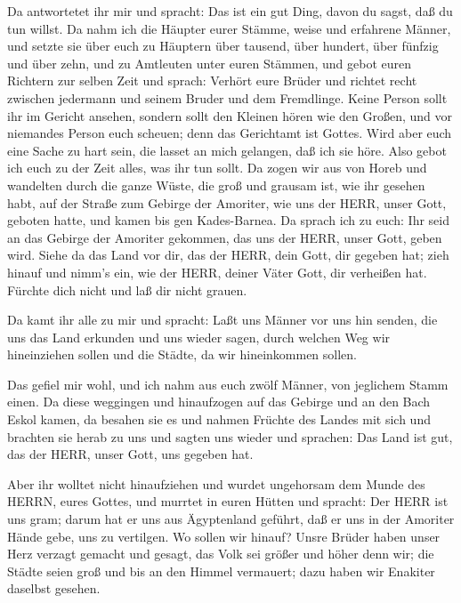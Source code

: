  Da antwortetet ihr mir und spracht: Das ist ein gut Ding,
davon du sagst, daß du tun willst.  Da nahm ich die Häupter
eurer Stämme, weise und erfahrene Männer, und setzte sie über euch zu
Häuptern über tausend, über hundert, über fünfzig und über zehn, und zu
Amtleuten unter euren Stämmen,  und gebot euren Richtern
zur selben Zeit und sprach: Verhört eure Brüder und richtet recht
zwischen jedermann und seinem Bruder und dem Fremdlinge. 
Keine Person sollt ihr im Gericht ansehen, sondern sollt den Kleinen
hören wie den Großen, und vor niemandes Person euch scheuen; denn das
Gerichtamt ist Gottes. Wird aber euch eine Sache zu hart sein, die
lasset an mich gelangen, daß ich sie höre.  Also gebot ich
euch zu der Zeit alles, was ihr tun sollt.  Da zogen wir
aus von Horeb und wandelten durch die ganze Wüste, die groß und grausam
ist, wie ihr gesehen habt, auf der Straße zum Gebirge der Amoriter, wie
uns der HERR, unser Gott, geboten hatte, und kamen bis gen Kades-Barnea.
 Da sprach ich zu euch: Ihr seid an das Gebirge der
Amoriter gekommen, das uns der HERR, unser Gott, geben wird.
 Siehe da das Land vor dir, das der HERR, dein Gott, dir
gegeben hat; zieh hinauf und nimm's ein, wie der HERR, deiner Väter
Gott, dir verheißen hat. Fürchte dich nicht und laß dir nicht grauen.

 Da kamt ihr alle zu mir und spracht: Laßt uns Männer vor
uns hin senden, die uns das Land erkunden und uns wieder sagen, durch
welchen Weg wir hineinziehen sollen und die Städte, da wir hineinkommen
sollen.

 Das gefiel mir wohl, und ich nahm aus euch zwölf Männer,
von jeglichem Stamm einen.  Da diese weggingen und
hinaufzogen auf das Gebirge und an den Bach Eskol kamen, da besahen sie
es  und nahmen Früchte des Landes mit sich und brachten sie
herab zu uns und sagten uns wieder und sprachen: Das Land ist gut, das
der HERR, unser Gott, uns gegeben hat.

 Aber ihr wolltet nicht hinaufziehen und wurdet ungehorsam
dem Munde des HERRN, eures Gottes,  und murrtet in euren
Hütten und spracht: Der HERR ist uns gram; darum hat er uns aus
Ägyptenland geführt, daß er uns in der Amoriter Hände gebe, uns zu
vertilgen.  Wo sollen wir hinauf? Unsre Brüder haben unser
Herz verzagt gemacht und gesagt, das Volk sei größer und höher denn wir;
die Städte seien groß und bis an den Himmel vermauert; dazu haben wir
Enakiter daselbst gesehen.

